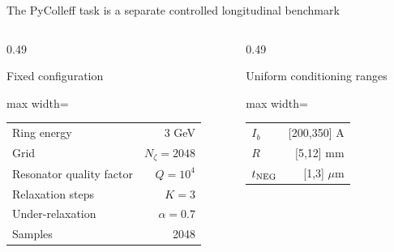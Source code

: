 \begin{frame}[t,shrink=5]{The PyColleff task is a separate controlled longitudinal benchmark}
\begin{columns}[T,onlytextwidth]
\begin{column}{0.49\textwidth}
\begin{block}{Fixed configuration}
\begin{center}\begin{adjustbox}{max width=\linewidth}
\begin{tabular}{lr}\toprule Ring energy & 3 GeV\\Grid & $N_\zeta=2048$\\Resonator quality factor & $Q=10^4$\\Relaxation steps & $K=3$\\Under-relaxation & $\alpha=0.7$\\Samples & 2048\\\bottomrule\end{tabular}
\end{adjustbox}\end{center}
\end{block}

\end{column}
\begin{column}{0.49\textwidth}
\begin{block}{Uniform conditioning ranges}
\begin{center}\begin{adjustbox}{max width=\linewidth}
\begin{tabular}{lr}\toprule $I_b$ & [200,350] A\\$R$ & [5,12] mm\\$t_{\rm NEG}$ & [1,3] $\mu$m\\\bottomrule\end{tabular}
\end{adjustbox}\end{center}
\end{block}

\end{column}
\end{columns}


\end{frame}

